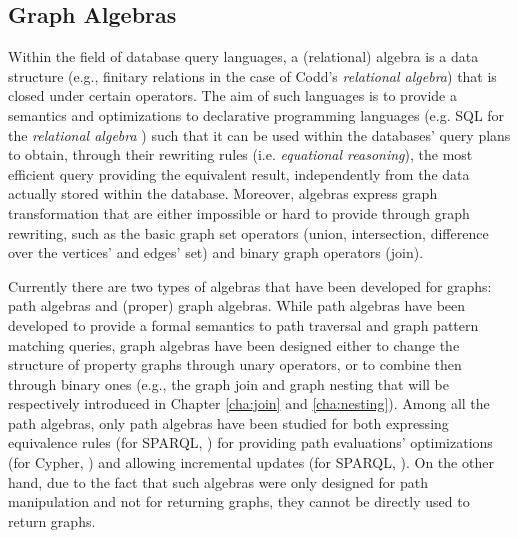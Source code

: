 \subsection{Graph Algebras}\label{cite:galg}
Within the field of database query languages, a (relational) algebra is a data structure (e.g., finitary relations in the case of Codd's \textit{relational algebra}) that is closed under certain operators. The aim of such languages is to provide a semantics and optimizations to declarative programming languages (e.g. SQL for the \textit{relational algebra} \cite{Ceri1985}) such that it can be used within the databases' query plans to obtain, through their rewriting rules (i.e. \textit{equational reasoning}), the most efficient query providing the equivalent result, independently from the data actually stored within the database. Moreover, algebras express graph transformation that are either impossible or hard to provide through graph rewriting, such as the basic graph set operators (union, intersection, difference over the vertices' and edges' set) and binary graph operators (join).

Currently there are two types of algebras that have been developed for graphs: path algebras and (proper) graph algebras. While path algebras have been developed to provide a formal semantics to path traversal and graph pattern matching queries, graph algebras have been designed either to change the structure of property graphs through unary operators, or to combine then through binary ones (e.g., the graph join and graph nesting that will be respectively introduced in Chapter \vref{cha:join} and \vref{cha:nesting}). Among all the path algebras, only path algebras have been studied for both expressing equivalence rules (for SPARQL, \cite{Perez2009}) for providing path evaluations' optimizations (for Cypher, \cite{Neo4jAlg}) and allowing incremental updates (for SPARQL, \cite{SparqlIncr}). On the other hand, due to the fact that such algebras were only designed for path manipulation and not for returning graphs, they cannot be directly used to return graphs.

